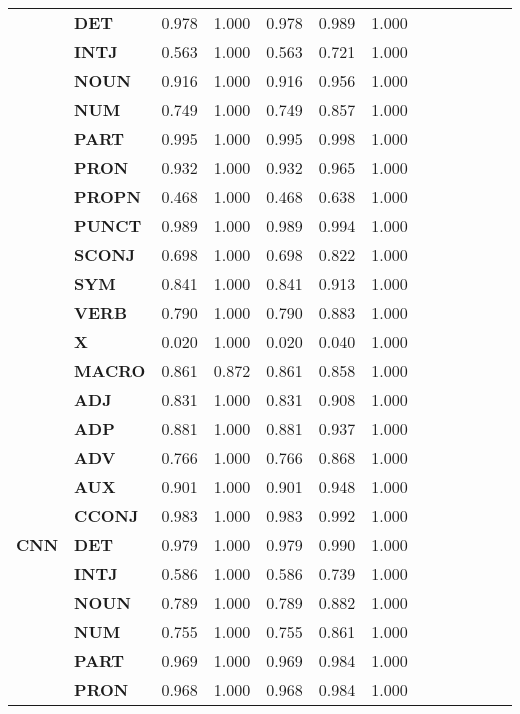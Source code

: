 \begin{longtable}{|l||l||l||l||l||l||l||l||l||l||l||l||l|}
\textbf{} & \textbf{DET} & 0.978 & 1.000 & 0.978 & 0.989 & 1.000 \\
\textbf{} & \textbf{INTJ} & 0.563 & 1.000 & 0.563 & 0.721 & 1.000 \\
\textbf{} & \textbf{NOUN} & 0.916 & 1.000 & 0.916 & 0.956 & 1.000 \\
\textbf{} & \textbf{NUM} & 0.749 & 1.000 & 0.749 & 0.857 & 1.000 \\
\textbf{} & \textbf{PART} & 0.995 & 1.000 & 0.995 & 0.998 & 1.000 \\
\textbf{} & \textbf{PRON} & 0.932 & 1.000 & 0.932 & 0.965 & 1.000 \\
\textbf{} & \textbf{PROPN} & 0.468 & 1.000 & 0.468 & 0.638 & 1.000 \\
\textbf{} & \textbf{PUNCT} & 0.989 & 1.000 & 0.989 & 0.994 & 1.000 \\
\textbf{} & \textbf{SCONJ} & 0.698 & 1.000 & 0.698 & 0.822 & 1.000 \\
\textbf{} & \textbf{SYM} & 0.841 & 1.000 & 0.841 & 0.913 & 1.000 \\
\textbf{} & \textbf{VERB} & 0.790 & 1.000 & 0.790 & 0.883 & 1.000 \\
\textbf{} & \textbf{X} & 0.020 & 1.000 & 0.020 & 0.040 & 1.000 \\
\textbf{} & \textbf{MACRO} & 0.861 & 0.872 & 0.861 & 0.858 & 1.000 \\
\cline{1-7}
\multirow[t]{18}{*}{\textbf{CNN}} & \textbf{ADJ} & 0.831 & 1.000 & 0.831 & 0.908 & 1.000 \\
\textbf{} & \textbf{ADP} & 0.881 & 1.000 & 0.881 & 0.937 & 1.000 \\
\textbf{} & \textbf{ADV} & 0.766 & 1.000 & 0.766 & 0.868 & 1.000 \\
\textbf{} & \textbf{AUX} & 0.901 & 1.000 & 0.901 & 0.948 & 1.000 \\
\textbf{} & \textbf{CCONJ} & 0.983 & 1.000 & 0.983 & 0.992 & 1.000 \\
\textbf{} & \textbf{DET} & 0.979 & 1.000 & 0.979 & 0.990 & 1.000 \\
\textbf{} & \textbf{INTJ} & 0.586 & 1.000 & 0.586 & 0.739 & 1.000 \\
\textbf{} & \textbf{NOUN} & 0.789 & 1.000 & 0.789 & 0.882 & 1.000 \\
\textbf{} & \textbf{NUM} & 0.755 & 1.000 & 0.755 & 0.861 & 1.000 \\
\textbf{} & \textbf{PART} & 0.969 & 1.000 & 0.969 & 0.984 & 1.000 \\
\textbf{} & \textbf{PRON} & 0.968 & 1.000 & 0.968 & 0.984 & 1.000 \\

\end{longtable}
